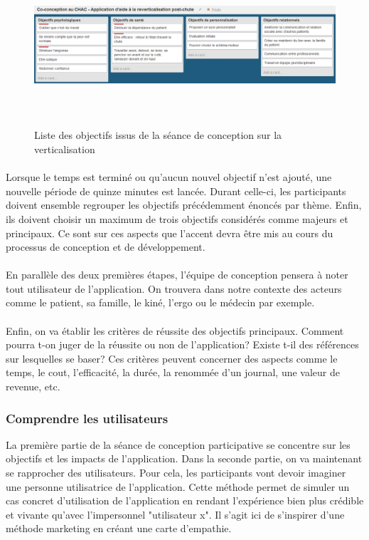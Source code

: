 \begin{figure}
	\centering
	\includegraphics[width = 16cm, height=6cm]{images/objectifs_ales.png}
	\caption{Liste des objectifs issus de la séance de conception sur la verticalisation}
	\label{objectifs_ales}
\end{figure}

\paragraph{} Lorsque le temps est terminé ou qu'aucun nouvel objectif n'est ajouté, une nouvelle période de quinze minutes est lancée. Durant celle-ci, les participants doivent ensemble regrouper les objectifs précédemment énoncés par thème. Enfin, ils doivent choisir un maximum de trois objectifs considérés comme majeurs et principaux. Ce sont sur ces aspects que l'accent devra être mis au cours du processus de conception et de développement.

\paragraph{}En parallèle des deux premières étapes, l'équipe de conception pensera à noter tout utilisateur de l'application. On trouvera dans notre contexte des acteurs comme le patient, sa famille, le kiné, l'ergo ou le médecin par exemple.

\paragraph{}Enfin, on va établir les critères de réussite des objectifs principaux. Comment pourra t-on juger de la réussite ou non de l'application? Existe t-il des références sur lesquelles se baser? Ces critères peuvent concerner des aspects comme le temps, le cout, l'efficacité, la durée, la renommée d'un journal, une valeur de revenue, etc.

	
	\subsubsection*{Comprendre les utilisateurs}
La première partie de la séance de conception participative se concentre sur les objectifs et les impacts de l'application. Dans la seconde partie, on va maintenant se rapprocher 	des utilisateurs. Pour cela, les participants vont devoir imaginer une personne utilisatrice de l'application. Cette méthode permet de simuler un cas concret d'utilisation de l'application en rendant l'expérience bien plus crédible et vivante qu'avec l'impersonnel "utilisateur x". Il s'agit ici de s'inspirer d'une méthode marketing en créant une carte d'empathie.

